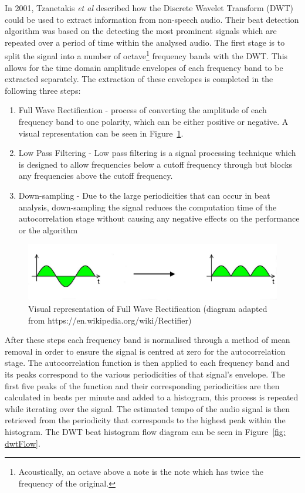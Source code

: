 \documentclass[a4paper, 11pt]{article}
\begin{document}
In 2001, Tzanetakis \textit{et al} described how the Discrete Wavelet Transform (DWT) could be used to extract information from non-speech audio\cite{tzane1}. Their beat detection algorithm was based on the detecting the most prominent signals which are repeated over a period of time within the analysed audio. The first stage is to split the signal into a number of octave\footnote{Acoustically, an octave above a note is the note which has twice the frequency of the original\cite{oxford-comp}.} frequency bands with the DWT. This allows for the time domain amplitude envelopes of each frequency band to be extracted separately. The extraction of these envelopes is completed in the following three steps:

\begin{enumerate}
\item Full Wave Rectification - process of converting the amplitude of each frequency band to one polarity\cite{pallas}, which can be either positive or negative. A visual representation can be seen in Figure~\ref{fig: fwr}.
\item Low Pass Filtering - Low pass filtering is a signal processing technique which is designed to allow frequencies below a cutoff frequency through but blocks any frequencies above the cutoff frequency\cite{smith}.
\item Down-sampling - Due to the large periodicities that can occur in beat analysis, down-sampling the signal reduces the computation time of the autocorrelation stage without causing any negative effects on the performance or the algorithm\cite{tzane3}
\end{enumerate}

\begin{figure}[ht]
	\centering
	\includegraphics[scale=0.25]{FWR2}
	\caption{Visual representation of Full Wave Rectification (diagram adapted from https://en.wikipedia.org/wiki/Rectifier)}
	\label{fig: fwr}
\end{figure}


After these steps each frequency band is normalised through a method of mean removal in order to ensure the signal is centred at zero for the autocorrelation stage. The autocorrelation function is then applied to each frequency band and its peaks correspond to the various periodicities of that signal's envelope. The first five peaks of the function and their corresponding periodicities are then calculated in beats per minute and added to a histogram, this process is repeated while iterating over the signal. The estimated tempo of the audio signal is then retrieved from the periodicity that corresponds to the highest peak within the histogram\cite{tzane1}. The DWT beat histogram flow diagram can be seen in Figure~\ref{fig: dwtFlow}.
\end{document}
